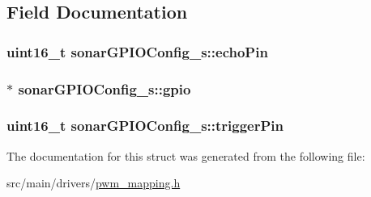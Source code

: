 \subsection{Field Documentation}
\hypertarget{structsonarGPIOConfig__s_a23ef1a41007db03133beb98c0ccb3fa7}{
\subsubsection[{echo\+Pin}]{\setlength{\rightskip}{0pt plus 5cm}uint16\+\_\+t sonar\+G\+P\+I\+O\+Config\+\_\+s\+::echo\+Pin}}\label{structsonarGPIOConfig__s_a23ef1a41007db03133beb98c0ccb3fa7}
\hypertarget{structsonarGPIOConfig__s_a5dd2f9efeb7270cabe20cdbd6ad8d95b}{
\subsubsection[{gpio}]{$\ast$ sonar\+G\+P\+I\+O\+Config\+\_\+s\+::gpio}}\label{structsonarGPIOConfig__s_a5dd2f9efeb7270cabe20cdbd6ad8d95b}
\hypertarget{structsonarGPIOConfig__s_a33c87f6ec63ad4b2e4ac98d0957d6bec}{
\subsubsection[{trigger\+Pin}]{\setlength{\rightskip}{0pt plus 5cm}uint16\+\_\+t sonar\+G\+P\+I\+O\+Config\+\_\+s\+::trigger\+Pin}}\label{structsonarGPIOConfig__s_a33c87f6ec63ad4b2e4ac98d0957d6bec}


The documentation for this struct was generated from the following file\+:\begin{DoxyCompactItemize}
\item 
src/main/drivers/\hyperlink{pwm__mapping_8h}{pwm\+\_\+mapping.\+h}\end{DoxyCompactItemize}
